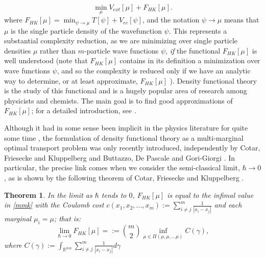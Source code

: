 \documentclass[letter,10pt]{article}
\theoremstyle{dotless}
\begin{document}
\begin{equation*}
\min_{\mu} V_{ext}[\mu] +F_{HK}[\mu].
\end{equation*}
where $F_{HK}[\mu] = \min_{ \psi \rightarrow \mu}T[\psi]+V_{ee}[\psi]$, and the notation $\psi \rightarrow \mu$ means that $\mu$ is the single particle density of the wavefunction $\psi$.    This represents a substantial complexity reduction, as we are minimizing over single particle densities $\mu$ rather than $m$-particle wave functions $\psi$, \textit{if} the functional $F_{HK}[\mu]$ is well understood (note that $F_{HK}[\mu]$ contains in its definition a minimization over wave functions $\psi$, and so the complexity is reduced only if we have an analytic way to determine, or at least approximate, $F_{HK}[\mu]$ ).  Density functional theory is the study of this functional and is a hugely popular area of research among physicists and chemists.  The main goal is to find good approximations of $F_{HK}[\mu]$; for a detailed introduction, see \cite{PY}.

Although it had in some sense been implicit in the physics literature for quite some time \cite{sggs} \cite{seidl}, the formulation of density functional theory as a  multi-marginal optimal transport problem was only recently introduced, independently by Cotar, Friesecke and Kluppelberg \cite{CFK} and Buttazzo, De Pascale and Gori-Giorgi \cite{bdpgg}.  In particular, the precise link  comes when we consider the semi-classical limit, $\hbar \rightarrow 0$, as is shown by the following theorem of Cotar, Friesecke and Kluppelberg \cite{CFK} \cite{cfk2}.

\newtheorem{semiclasslim}{Theorem}[subsection]

\begin{semiclasslim}
In the limit as $\hbar$ tends to $0$, $F_{HK}[\mu]$ is equal to the infimal value in \eqref{mmk}  with the Coulomb cost $c(x_1,x_2,...,x_m):=\sum_{i \neq j}^m \frac{1}{|x_i-x_j| }$ and each marginal $\mu_i =\mu$; that is:
$$
\lim_{\hbar \rightarrow 0} F_{HK}[\mu] =:={m \choose 2}\inf_{\mu \in \Pi(\mu,\mu,...\mu)}C(\gamma),
$$
where $C(\gamma):=\int_{\mathbb{R}^{nm}}\sum_{i \neq j}^m \frac{1}{|x_i-x_j| }d\gamma$
\end{semiclasslim}



\newtheorem{symm}[semiclasslim]{Remark}
\end{document}
